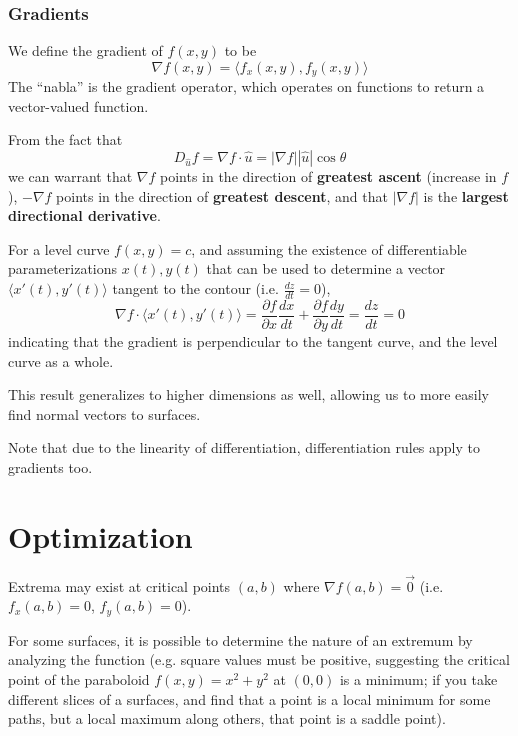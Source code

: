 \documentclass{article}
\newcommand{\vect}[1]{\ensuremath{\overrightarrow{#1}}}
\newcommand{\abs}[1]{\left|#1\right|}
\begin{document}
\subsubsection{Gradients}
We define the gradient of $f(x,y)$ to be
$$\nabla f(x,y) = \langle f_x(x,y), f_y(x,y) \rangle$$
The ``nabla'' is the gradient operator, which operates on functions to return a vector-valued function.

From the fact that $$D_{\hat{u}}f=\nabla f \cdot \hat{u}=\abs{\nabla f}\abs{\hat{u}}\cos{\theta}$$ we can warrant that $\nabla f$ points in the direction of \textbf{greatest ascent} (increase in $f$), $-\nabla f$ points in the direction of \textbf{greatest descent}, and that $\abs{\nabla f}$ is the \textbf{largest directional derivative}.

For a level curve $f(x,y)=c$, and assuming the existence of differentiable parameterizations $x(t), y(t)$ that can be used to determine a vector $\langle x'(t), y'(t)\rangle$ tangent to the contour (i.e. $\frac{dz}{dt}=0$), $$\nabla{f}\cdot\langle x'(t), y'(t)\rangle=\frac{\partial f}{\partial x}\frac{dx}{dt}+\frac{\partial f}{\partial y}\frac{dy}{dt}=\frac{dz}{dt}=0$$
indicating that the gradient is perpendicular to the tangent curve, and the level curve as a whole.

This result generalizes to higher dimensions as well, allowing us to more easily find normal vectors to surfaces.

Note that due to the linearity of differentiation, differentiation rules apply to gradients too.

\section{Optimization}
Extrema may exist at critical points $(a,b)$ where $\nabla f(a,b) = \vect{0}$ (i.e. $f_x(a,b)=0$, $f_y(a,b)=0$).

For some surfaces, it is possible to determine the nature of an extremum by analyzing the function (e.g. square values must be positive, suggesting the critical point of the paraboloid $f(x,y)=x^2+y^2$ at $(0,0)$ is a minimum; if you take different slices of a surfaces, and find that a point is a local minimum for some paths, but a local maximum along others, that point is a saddle point).
\end{document}
